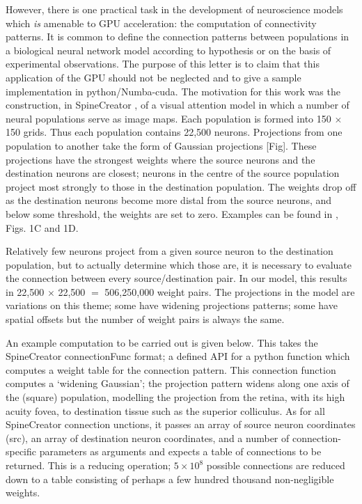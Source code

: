 \documentclass[11pt, a4paper]{article}
\begin{document}
However, there is one practical task in the development of neuroscience models
which \emph{is} amenable to GPU acceleration: the computation of connectivity
patterns. It is common to define the connection patterns between populations
in a biological neural network model according to hypothesis or on the basis
of experimental observations. The purpose of this letter is to claim that this
application of the GPU should not be neglected and to give a sample
implementation in python/Numba-cuda. The motivation for this work was the
construction, in
SpineCreator \cite{cope_spinecreator_2015,cope_spinecreator:_2016}, of a
visual attention model in which a number of neural populations serve as image
maps. Each population is formed into 150 $\times$ 150 grids. Thus each
population contains 22,500 neurons. Projections from one population to another
take the form of Gaussian projections [Fig]. These projections have the
strongest weights where the source neurons and the destination neurons are
closest; neurons in the centre of the source population project most strongly
to those in the destination population. The weights drop off as the
destination neurons become more distal from the source neurons, and below some
threshold, the weights are set to zero. Examples can be found
in \cite{james_integrating_2018}, Figs. 1C and 1D.

Relatively few neurons project from a given source neuron to the destination
population, but to actually determine which those are, it is necessary to
evaluate the connection between every source/destination pair. In our model,
this results in 22,500 $\times$ 22,500 $=$ 506,250,000 weight pairs. The
projections in the model are variations on this theme; some have widening
projections patterns; some have spatial offsets but the number of weight pairs
is always the same.

An example computation to be carried out is given below. This takes the
SpineCreator connectionFunc format; a defined API for a python function which
computes a weight table for the connection pattern. This connection function
computes a `widening Gaussian'; the projection pattern widens along one axis
of the (square) population, modelling the projection from the retina, with its
high acuity fovea, to destination tissue such as the superior colliculus. As
for all SpineCreator connection unctions, it passes an array of source neuron
coordinates (src), an array of destination neuron coordinates, and a number of
connection-specific parameters as arguments and expects a table of connections
to be returned. This is a reducing operation; $5\times10^8$ possible
connections are reduced down to a table consisting of perhaps a few hundred
thousand non-negligible weights.
\end{document}
